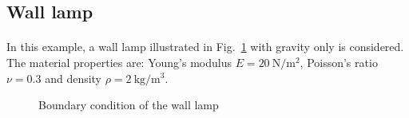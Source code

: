 \subsection{Wall lamp}
\paragraph{}
In this example, a wall lamp illustrated in Fig.~\ref{oct_ex:lamp_geo_bc} with gravity only is considered.
The material properties are:  Young’s modulus $E = \SI{20}{\newton \per \square \meter}$, Poisson’s ratio $\nu = 0.3$ and density $\rho = \SI{2}{\kilo \gram \per \cubic \meter}$.
\begin{figure}
    \centering
    \caption[Boundary condition of the wall lamp]{Boundary condition of the wall lamp}
    \label{oct_ex:lamp_geo_bc}
\end{figure}

